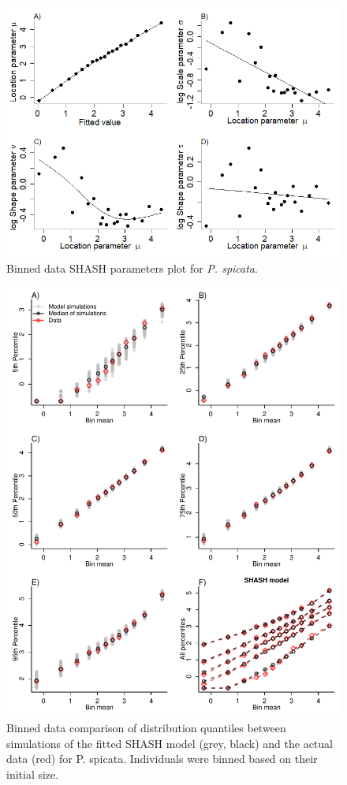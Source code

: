 \documentclass[11pt]{article}
\begin{document}
{\begin{enumerate}
\begin{figure}[tbp]
\centering
\includegraphics[width=.9\textwidth]{figures/RollingSHASHparsPSSP.png}
\caption{Binned data SHASH parameters plot for \emph{P. spicata}. }
\label{fig:rollingSHASHparsPSSP}
\end{figure} 


\begin{figure}[tbp]
\centering
\includegraphics[width=.9\textwidth]{figures/QuantileComparePlotPSSP.pdf}
\caption{Binned data comparison of distribution quantiles between simulations of the fitted SHASH model (grey, black) and the actual data (red) for 
{P. spicata}. Individuals were binned based on their initial size. }
\label{fig:BinnedConditionalQuantiles}
\end{figure} 



\end{enumerate}}
\end{document}
